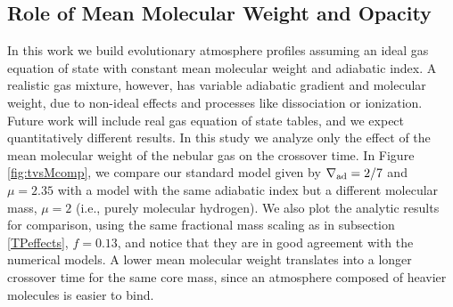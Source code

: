 \documentclass[apj]{emulateapj}
\newcommand{\delad}{\nabla_{\rm ad}}
\begin{document}



\subsection{Role of Mean Molecular Weight and Opacity}
\label{muopacity}
%
%

In this work we build evolutionary atmosphere profiles assuming an ideal gas equation of state with constant mean molecular weight and adiabatic index. A realistic gas mixture, however, has variable adiabatic gradient and molecular weight, due to non-ideal effects and processes like dissociation or ionization. Future work will include real gas equation of state tables, and we expect quantitatively different results. In this study we analyze only the effect of the mean molecular weight of the nebular gas on the crossover time.   In Figure \ref{fig:tvsMcomp}, we compare our standard model given by $\delad=2/7$ and $\mu=2.35$ with a model with the same adiabatic index but a different molecular mass, $\mu=2$ (i.e., purely molecular hydrogen). We also plot the analytic results for comparison, using the same fractional mass scaling as in subsection \ref{TPeffects}, $f=0.13$, and notice that they are in good agreement with the numerical models. A lower mean molecular weight translates into a longer crossover time for the same core mass, since an atmosphere composed of heavier molecules is easier to bind. 
\end{document}
